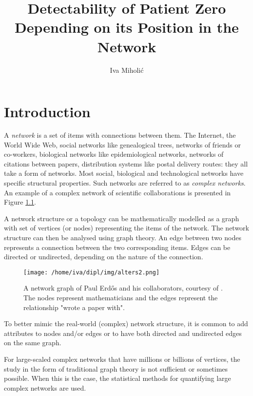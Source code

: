 \documentclass[times, utf8, diplomski]{fer}
\begin{document}
\title{Detectability of Patient Zero Depending on its Position in the Network}
\author{Iva Miholić}
\maketitle
\izvornik
\zahvala{}
\tableofcontents
\listofalgorithms
{}
\listoftables

\chapter{Introduction}

A \emph{network} is a set of items with connections between them. The Internet, the World Wide Web, social networks like genealogical trees, networks of friends or co-workers, biological networks like epidemiological networks, networks of citations between papers, distribution systems like postal delivery routes: they all take a form of networks. Most social, biological and technological networks have specific structural properties. Such networks are referred to as \emph{complex networks}.  An example of a complex network of scientific collaborations is presented in Figure \ref{net}.

A network structure or a topology can be mathematically modelled as a graph with set of vertices (or nodes) representing the items of the network. The network structure can then be analysed using graph theory. An edge between two nodes represents a connection between the two corresponding items. Edges can be directed or undirected, depending  on the nature of the connection.  
\begin{figure}[h]
\centering
\texttt{[image: /home/iva/dipl/img/alters2.png]}
\caption{A network graph of Paul Erd{\H{o}}s and his collaborators, courtesy of \citet{krebs}. The nodes represent mathematicians and the edges represent the relationship "wrote a paper with".}
\label{net}
\end{figure}

To better mimic the real-world (complex) network structure, it is common to add attributes to nodes and/or edges or to have both directed and undirected edges on the same graph.

For large-scaled complex networks that have millions or billions of vertices, the study in the form of traditional graph theory is not sufficient or sometimes possible. When this is the case, the statistical methods  for quantifying large complex networks are used. 
\end{document}
